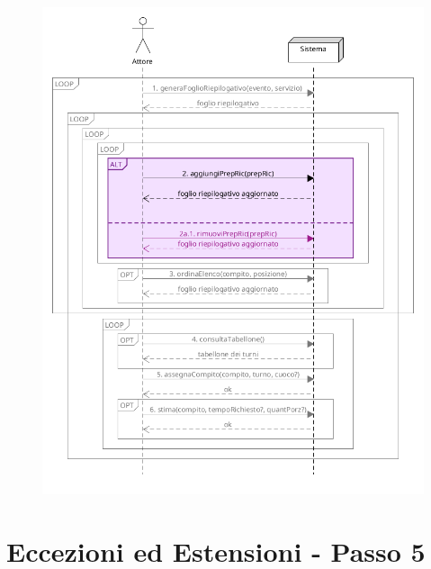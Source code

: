 \begin{figure}[h]
  \begin{center}
    \includegraphics[scale = 0.53]{images/SSD/SSD - passo 2.png}
  \end{center}
\end{figure}

\pagebreak

\section{Eccezioni ed Estensioni - Passo 5}

